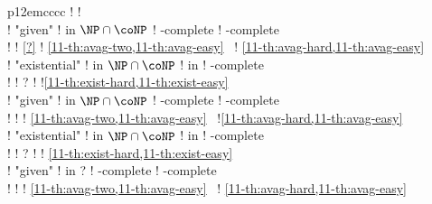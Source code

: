 \begin{landscape}
\begin{tabular}{p{12em}cccc}
  ! %
  ! 
  \\
  ! "given"
  ! in $\NP\cap\coNP$ 
  ! \EXP-complete
  ! \kEXP[2]-complete
  \\[-.5em]
  ! %
  ! {\tiny\cref{?}}                
  !
    {\tiny\cref{11-th:avag-two,11-th:avag-easy}~\cite{Fahrenberg&Juhl&Larsen&Srba:2011,Courtois&Schmitz:2014}}
  ! {\tiny\cref{11-th:avag-hard,11-th:avag-easy} \cite{Courtois&Schmitz:2014}}\\
  \addlinespace
  ! "existential"
  ! in $\NP\cap\coNP$
  ! in \coNP
  ! \coNP-complete
  \\[-.5em]
  ! %
  ! {\tiny\cite{Chatterjee&Doyen:2012}?}
  !
  !{\tiny\cref{11-th:exist-hard,11-th:exist-easy}~\cite{Chatterjee&Doyen&Henzinger&Raskin:2010}}
  \\
  ! "given"
  ! in $\NP\cap\coNP$ 
  ! \EXP-complete
  ! \kEXP[2]-complete
  \\[-.5em]
  ! %
  ! {\tiny\cite{Bouyer&Fahrenberg&Larsen&Markey&Srba:2008}}
  ! {\tiny\cref{11-th:avag-two,11-th:avag-easy}~\cite{Fahrenberg&Juhl&Larsen&Srba:2011,Jurdzinski&Lazic&Schmitz:2015}}
  !{\tiny\cref{11-th:avag-hard,11-th:avag-easy}~\cite{Courtois&Schmitz:2014,Jurdzinski&Lazic&Schmitz:2015}}
  \\
  \addlinespace
  ! "existential"
  ! in $\NP\cap\coNP$
  ! in \coNP 
  ! \coNP-complete
  \\[-.5em]
  ! %
  ! {\tiny\cite{Chatterjee&Doyen:2012}?}
  ! 
  ! {\tiny\cref{11-th:exist-hard,11-th:exist-easy}~\cite{Chatterjee&Doyen&Henzinger&Raskin:2010,Chatterjee&Randour&Raskin:2014}}
  \\
  ! "given"
  ! in \EXP?%
  ! \EXP-complete
  ! \kEXP[2]-complete
  \\[-.5em]
  ! %
  ! {\tiny}
  ! {\tiny\cref{11-th:avag-two,11-th:avag-easy}~\cite{Fahrenberg&Juhl&Larsen&Srba:2011,Colcombet&Jurdzinski&Lazic&Schmitz:2017}} 
  ! {\tiny\cref{11-th:avag-hard,11-th:avag-easy}~\cite{Courtois&Schmitz:2014,Colcombet&Jurdzinski&Lazic&Schmitz:2017}}\\
  \bottomrule  
  \end{tabular}
  \fi
  \endgroup
    \end{landscape}
